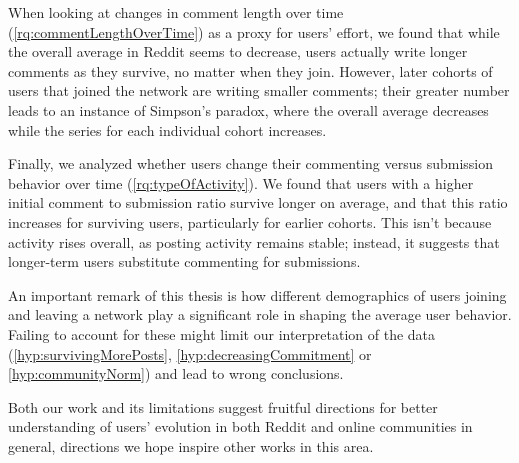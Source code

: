 When looking at changes in comment length over time (\ref{rq:commentLengthOverTime}) as a proxy for users' effort, we found that while the overall average in Reddit seems to decrease, users actually write longer comments as they survive, no matter when they join.  However, later cohorts of users that joined the network are writing smaller comments; their greater number leads to an instance of Simpson's paradox, where the overall average decreases while the series for each individual cohort increases. 

Finally, we analyzed whether users change their commenting versus submission behavior over time (\ref{rq:typeOfActivity}). 
We found that users with a higher initial comment to submission ratio survive longer on average, and that this ratio increases for surviving users, particularly for earlier cohorts.  This isn't because activity rises overall, as posting activity remains stable; instead, it suggests that longer-term users substitute commenting for submissions. 

An important remark of this thesis is how different demographics of users joining and leaving a network play a significant role in shaping the average user behavior. Failing to account for these might limit our interpretation of the data (\ref{hyp:survivingMorePosts}, \ref{hyp:decreasingCommitment} or \ref{hyp:communityNorm}) and lead to wrong conclusions.

Both our work and its limitations suggest fruitful directions for better understanding of users' evolution in both Reddit and online communities in general, directions we hope inspire other works in this area.  
